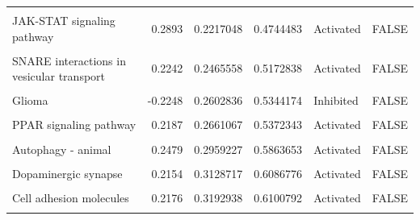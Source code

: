 \documentclass[9pt,a4paper,]{extarticle}
\begin{document}
\begin{table}
{\begin{tabular}[t]{lrrrll}
\cellcolor{gray!6}{Inflammatory bowel disease} & \cellcolor{gray!6}{0.2687} & \cellcolor{gray!6}{0.2204814} & \cellcolor{gray!6}{0.4744483} & \cellcolor{gray!6}{Activated} & \cellcolor{gray!6}{FALSE}\\
JAK-STAT signaling pathway & 0.2893 & 0.2217048 & 0.4744483 & Activated & FALSE\\
\addlinespace
\cellcolor{gray!6}{GnRH signaling pathway} & \cellcolor{gray!6}{0.2447} & \cellcolor{gray!6}{0.2275518} & \cellcolor{gray!6}{0.4821395} & \cellcolor{gray!6}{Activated} & \cellcolor{gray!6}{FALSE}\\
SNARE interactions in vesicular transport & 0.2242 & 0.2465558 & 0.5172838 & Activated & FALSE\\
\cellcolor{gray!6}{Neuroactive ligand-receptor interaction} & \cellcolor{gray!6}{-0.1945} & \cellcolor{gray!6}{0.2552735} & \cellcolor{gray!6}{0.5303741} & \cellcolor{gray!6}{Inhibited} & \cellcolor{gray!6}{FALSE}\\
Glioma & -0.2248 & 0.2602836 & 0.5344174 & Inhibited & FALSE\\
\cellcolor{gray!6}{Phototransduction} & \cellcolor{gray!6}{0.2291} & \cellcolor{gray!6}{0.2622141} & \cellcolor{gray!6}{0.5344174} & \cellcolor{gray!6}{Activated} & \cellcolor{gray!6}{FALSE}\\
\addlinespace
PPAR signaling pathway & 0.2187 & 0.2661067 & 0.5372343 & Activated & FALSE\\
\cellcolor{gray!6}{Morphine addiction} & \cellcolor{gray!6}{-0.2098} & \cellcolor{gray!6}{0.2953474} & \cellcolor{gray!6}{0.5863653} & \cellcolor{gray!6}{Inhibited} & \cellcolor{gray!6}{FALSE}\\
Autophagy - animal & 0.2479 & 0.2959227 & 0.5863653 & Activated & FALSE\\
\cellcolor{gray!6}{Cocaine addiction} & \cellcolor{gray!6}{-0.1888} & \cellcolor{gray!6}{0.3021013} & \cellcolor{gray!6}{0.5931163} & \cellcolor{gray!6}{Inhibited} & \cellcolor{gray!6}{FALSE}\\
Dopaminergic synapse & 0.2154 & 0.3128717 & 0.6086776 & Activated & FALSE\\
\addlinespace
\cellcolor{gray!6}{Measles} & \cellcolor{gray!6}{0.2019} & \cellcolor{gray!6}{0.3186377} & \cellcolor{gray!6}{0.6100792} & \cellcolor{gray!6}{Activated} & \cellcolor{gray!6}{FALSE}\\
Cell adhesion molecules & 0.2176 & 0.3192938 & 0.6100792 & Activated & FALSE\\
\cellcolor{gray!6}{Renin secretion} & \cellcolor{gray!6}{0.2054} & \cellcolor{gray!6}{0.3245227} & \cellcolor{gray!6}{0.6145828} & \cellcolor{gray!6}{Activated} & \cellcolor{gray!6}{FALSE}\\

\end{tabular}}
\end{table}
\end{document}
